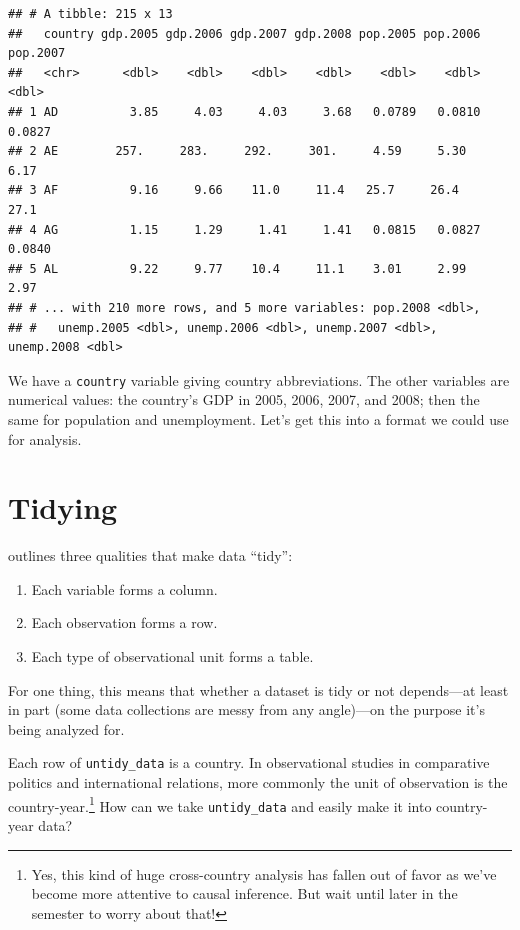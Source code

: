\documentclass[
  12pt,
  oneside,openany]{book}
\providecommand{\tightlist}{%
  \setlength{\itemsep}{0pt}\setlength{\parskip}{0pt}}
\begin{document}
\begin{verbatim}
## # A tibble: 215 x 13
##   country gdp.2005 gdp.2006 gdp.2007 gdp.2008 pop.2005 pop.2006 pop.2007
##   <chr>      <dbl>    <dbl>    <dbl>    <dbl>    <dbl>    <dbl>    <dbl>
## 1 AD          3.85     4.03     4.03     3.68   0.0789   0.0810   0.0827
## 2 AE        257.     283.     292.     301.     4.59     5.30     6.17  
## 3 AF          9.16     9.66    11.0     11.4   25.7     26.4     27.1   
## 4 AG          1.15     1.29     1.41     1.41   0.0815   0.0827   0.0840
## 5 AL          9.22     9.77    10.4     11.1    3.01     2.99     2.97  
## # ... with 210 more rows, and 5 more variables: pop.2008 <dbl>,
## #   unemp.2005 <dbl>, unemp.2006 <dbl>, unemp.2007 <dbl>, unemp.2008 <dbl>
\end{verbatim}

We have a \texttt{country} variable giving country abbreviations. The other variables are numerical values: the country's GDP in 2005, 2006, 2007, and 2008; then the same for population and unemployment. Let's get this into a format we could use for analysis.

\hypertarget{tidying}{%
\section{Tidying}\label{tidying}}

\citet{Wickham:2014vp} outlines three qualities that make data ``tidy'':

\begin{enumerate}
\def\labelenumi{\arabic{enumi}.}
\tightlist
\item
  Each variable forms a column.
\item
  Each observation forms a row.
\item
  Each type of observational unit forms a table.
\end{enumerate}

For one thing, this means that whether a dataset is tidy or not depends---at least in part (some data collections are messy from any angle)---on the purpose it's being analyzed for.

Each row of \texttt{untidy\_data} is a country. In observational studies in comparative politics and international relations, more commonly the unit of observation is the country-year.\footnote{Yes, this kind of huge cross-country analysis has fallen out of favor as we've become more attentive to causal inference. But wait until later in the semester to worry about that!} How can we take \texttt{untidy\_data} and easily make it into country-year data?
\end{document}
